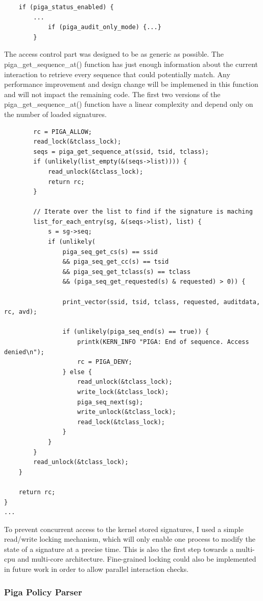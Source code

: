 \documentclass[pdftex,a4paper,titlepage,11pt]{article}
\begin{document}
\begin{lstlisting}
	if (piga_status_enabled) {
		...
			if (piga_audit_only_mode) {...}
		}
\end{lstlisting}

\medskip

The access control part was designed to be as generic as possible. The
piga\_get\_sequence\_at() function has just enough information about the current
interaction to retrieve every sequence that could potentially match. Any
performance improvement and design change will be implemened in this function
and will not impact the remaining code. The first two versions of the
piga\_get\_sequence\_at() function have a linear complexity and depend only on
the number of loaded signatures.

\begin{lstlisting}
		rc = PIGA_ALLOW;
		read_lock(&tclass_lock);
		seqs = piga_get_sequence_at(ssid, tsid, tclass);
		if (unlikely(list_empty(&(seqs->list)))) {
			read_unlock(&tclass_lock);
			return rc;
		}

		// Iterate over the list to find if the signature is maching
		list_for_each_entry(sg, &(seqs->list), list) {
			s = sg->seq;
			if (unlikely(
				piga_seq_get_cs(s) == ssid
				&& piga_seq_get_cc(s) == tsid
				&& piga_seq_get_tclass(s) == tclass
				&& (piga_seq_get_requested(s) & requested) > 0)) {

				print_vector(ssid, tsid, tclass, requested, auditdata, rc, avd);

				if (unlikely(piga_seq_end(s) == true)) {
					printk(KERN_INFO "PIGA: End of sequence. Access denied\n");
					rc = PIGA_DENY;
				} else {
					read_unlock(&tclass_lock);
					write_lock(&tclass_lock);
					piga_seq_next(sg);
					write_unlock(&tclass_lock);
					read_lock(&tclass_lock);
				}
			}
		}
		read_unlock(&tclass_lock);
	}

	return rc;
}
...
\end{lstlisting}

\medskip

To prevent concurrent access to the kernel stored signatures, I used a simple
read/write locking mechanism, which will only enable one process to modify the
state of a signature at a precise time. This is also the first step towards a
multi-cpu and multi-core architecture. Fine-grained locking could also be
implemented in future work in order to allow parallel interaction checks.

\subsubsection{Piga Policy Parser}
\end{document}
